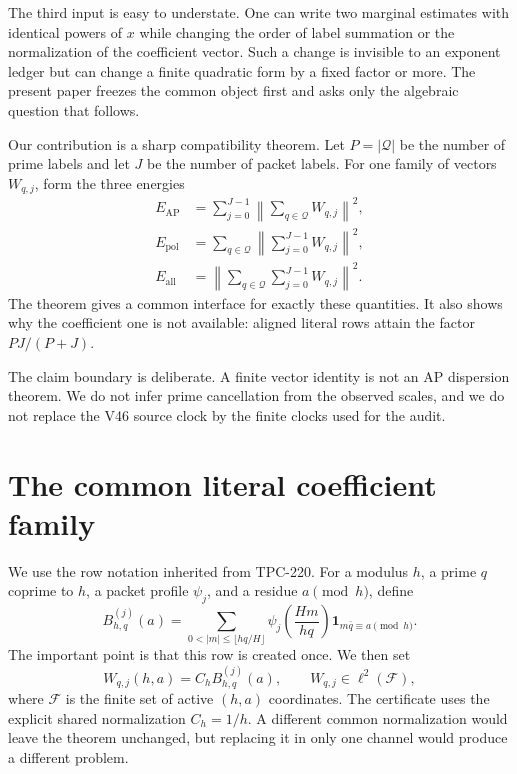 \documentclass[11pt]{article}
\theoremstyle{remark}
\newcommand{\Eall}{E_{\mathrm{all}}}
\newcommand{\Eap}{E_{\mathrm{AP}}}
\newcommand{\Epol}{E_{\mathrm{pol}}}
\newcommand{\Qset}{\mathcal Q}
\begin{document}
The third input is easy to understate.  One can write two marginal estimates
with identical powers of $x$ while changing the order of label summation or
the normalization of the coefficient vector.  Such a change is invisible to
an exponent ledger but can change a finite quadratic form by a fixed factor or
more.  The present paper freezes the common object first and asks only the
algebraic question that follows.

Our contribution is a sharp compatibility theorem.  Let $P=|\Qset|$ be the
number of prime labels and let $J$ be the number of packet labels.  For one
family of vectors $W_{q,j}$, form the three energies
\begin{align}
 \Eap&=\sum_{j=0}^{J-1}\left\|\sum_{q\in\Qset}W_{q,j}\right\|^2,\label{eq:ap}\\
 \Epol&=\sum_{q\in\Qset}\left\|\sum_{j=0}^{J-1}W_{q,j}\right\|^2,\label{eq:pol}\\
 \Eall&=\left\|\sum_{q\in\Qset}\sum_{j=0}^{J-1}W_{q,j}\right\|^2.\label{eq:all}
\end{align}
The theorem gives a common interface for exactly these quantities.  It also
shows why the coefficient one is not available: aligned literal rows attain
the factor $PJ/(P+J)$.

The claim boundary is deliberate.  A finite vector identity is not an AP
dispersion theorem.  We do not infer prime cancellation from the observed
scales, and we do not replace the V46 source clock by the finite clocks used
for the audit.

\section{The common literal coefficient family}

We use the row notation inherited from TPC-220.  For a modulus $h$, a prime
$q$ coprime to $h$, a packet profile $\psi_j$, and a residue $a\pmod h$,
define
\begin{equation}
 B_{h,q}^{(j)}(a)=
 \sum_{0<|m|\leq \lfloor hq/H\rfloor}
 \psi_j\!\left(\frac{Hm}{hq}\right)
 \mathbf 1_{m\bar q\equiv a\pmod h}.
 \label{eq:row}
\end{equation}
The important point is that this row is created once.  We then set
\begin{equation}
 W_{q,j}(h,a)=C_h B_{h,q}^{(j)}(a),
 \qquad W_{q,j}\in\ell^2(\mathcal F),
 \label{eq:vector}
\end{equation}
where $\mathcal F$ is the finite set of active $(h,a)$ coordinates.  The
certificate uses the explicit shared normalization $C_h=1/h$.  A different
common normalization would leave the theorem unchanged, but replacing it in
only one channel would produce a different problem.
\end{document}

